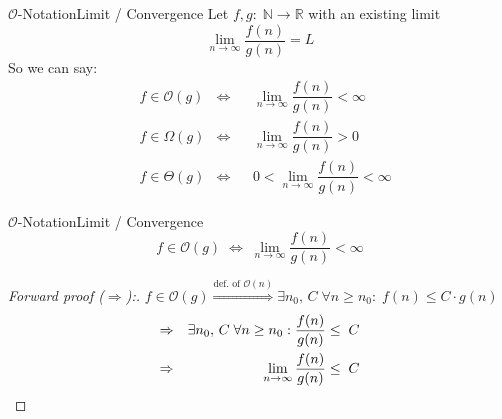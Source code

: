 
\begin{frame}{$\mathcal{O}$-Notation}{Limit / Convergence}
  Let $f,g \! : \; \mathbb{N} \to \mathbb{R}$ with an existing limit
  \[\lim_{n \to \infty} \dfrac{f(n)}{g(n)} = L\]
  So we can say:
  \begin{align}
    & f \in \mathcal{O}(g) & \Leftrightarrow
    && \lim_{n \to \infty} \dfrac{f(n)}{g(n)} < \infty\\
    & f \in \Omega(g) & \Leftrightarrow
    && \lim_{n \to \infty} \dfrac{f(n)}{g(n)} > 0\\
    & f \in \Theta(g) & \Leftrightarrow
    && 0 < \lim_{n \to \infty} \dfrac{f(n)}{g(n)} < \infty
  \end{align}
\end{frame}


\begin{frame}{$\mathcal{O}$-Notation}{Limit / Convergence}
  \[
    f \in \mathcal{O}(g)
    \; \Leftrightarrow \;
    \lim\limits_{n \rightarrow \infty} \frac{f(n)}{g(n)} < \infty
  \]
  \begin{proof}[Forward proof ($\Rightarrow$):]
     $f \in \mathcal{O}(g) \stackrel{\text{def. of }\mathcal{O}(n)}{\Rightarrow}
     \exists n_0, \, C\; \forall n \geq n_0:
     \; f(n) \leq C \cdot g(n)$
     \begin{alignat*}{2}
       \Rightarrow && \exists n_0, \, C\; \forall n \geq n_0: \dfrac{f(n)}{g(n)} &\leq \; C\\
       \Rightarrow && \displaystyle
       \lim_{n \to \infty}\dfrac{f(n)}{g(n)} &\leq \; C
       \qedhere
      \end{alignat*}
  \end{proof}
\end{frame}


